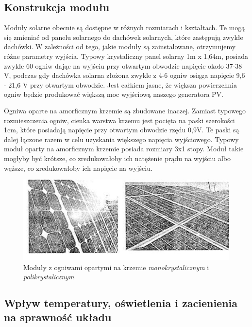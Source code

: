 \documentclass[12pt,a4paper]{article}
\begin{document}
\subsection{Konstrukcja modułu}

Moduły solarne obecnie są dostępne w różnych rozmiarach i kształtach. Te mogą się zmieniać od panelu solarnego do dachówek solarnych, które zastępują zwykłe dachówki. W zależności od tego, jakie moduły są zainstalowane, otrzymujemy różne parametry wyjścia. Typowy krystaliczny panel solarny 1m x 1,64m, posiada zwykle 60 ogniw dając na wyjściu przy otwartym obwodzie napięcie około 37-38 V, podczas gdy dachówka solarna złożona zwykle z 4-6 ogniw osiąga napięcie 9,6 - 21,6 V przy otwartym obwodzie. Jest całkiem jasne, że większa powierzchnia ogniw będzie produkować większą moc wyjściową naszego generatora PV. 

Ogniwa oparte na amorficznym krzemie są zbudowane inaczej. Zamiast typowego rozmieszczenia ogniw, cienka warstwa krzemu jest pocięta na paski szerokości 1cm, które posiadają napięcie przy otwartym obwodzie rzędu 0,9V. Te paski są dalej łączone razem w celu uzyskania większego napięcia wyjściowego. Typowy moduł oparty na amorficznym krzemie posiada rozmiary 3x1 stopy. Moduł takie mogłyby być krótsze, co zredukowałoby ich natężenie prądu na wyjściu albo węższe, co zredukowałoby ich napięcie na wyjściu. 

\begin{figure}[h]
\centering
\caption{Moduły z ogniwami opartymi na krzemie \textit{monokrystalicznym }i  \textit{polikrystalicznym} }
\includegraphics[natwidth=13.60cm,natheight=5.34cm]{media/image8.jpg}
\end{figure}



\subsection{Wpływ temperatury, oświetlenia i zacienienia na sprawność układu}
\end{document}
